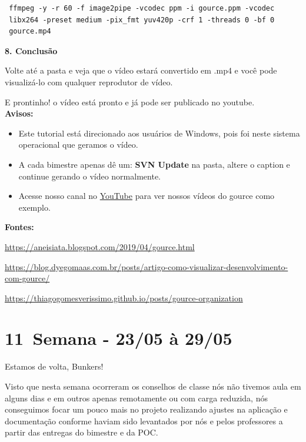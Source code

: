 \lstset{language=Fortran,
             basicstyle=\ttfamily\small,
             showstringspaces=false
    }
        \begin{lstlisting} 
 ffmpeg -y -r 60 -f image2pipe -vcodec ppm -i gource.ppm -vcodec 
 libx264 -preset medium -pix_fmt yuv420p -crf 1 -threads 0 -bf 0 
 gource.mp4
        \end{lstlisting} 

\textbf{8. Conclusão}

Volte até a pasta e veja que o vídeo estará convertido em .mp4 e você pode visualizá-lo com qualquer reprodutor de vídeo.

E prontinho! o vídeo está pronto e já pode ser publicado no \gls{youtube}. \\

\textbf{Avisos:}
\begin{itemize}
    \item Este tutorial está direcionado aos usuários de Windows, pois foi neste sistema operacional que geramos o vídeo. 
    \item A cada bimestre apenas dê um: \textbf{SVN Update} na pasta, altere o caption e continue gerando o vídeo normalmente.
    \item Acesse nosso canal no \href{https://www.youtube.com/channel/UCOJVZlclPTqngZQwPS9Fvpg/featured}{YouTube} para ver nossos vídeos do \gls{gource} como exemplo.
\end{itemize}

\textbf{Fontes:}

\noindent\href{https://aneisiata.blogspot.com/2019/04/gource.html}{https://aneisiata.blogspot.com/2019/04/gource.html}

\noindent\href{https://blog.dyegomaas.com.br/posts/artigo-como-visualizar-desenvolvimento-com-gource/}{https://blog.dyegomaas.com.br/posts/artigo-como-visualizar-desenvolvimento-com-gource/}

\noindent\href{https://thiagogomesverissimo.github.io/posts/gource-organization}{https://thiagogomesverissimo.github.io/posts/gource-organization}


\section{11\textordfeminine \, Semana - 23/05 à 29/05}
Estamos de volta, Bunkers!

Visto que nesta semana ocorreram os conselhos de classe nós não tivemos aula em alguns dias e em outros apenas remotamente ou com carga reduzida, nós conseguimos focar um pouco mais no projeto realizando ajustes na aplicação e documentação conforme haviam sido levantados por nós e pelos professores a partir das entregas do bimestre e da \acs{POC}.

